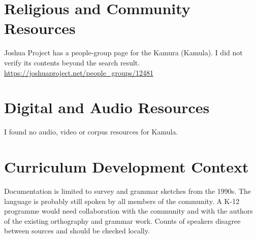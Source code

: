 \documentclass[12pt]{article}
\begin{document}
\section{Religious and Community Resources}
Joshua Project has a people-group page for the Kamura (Kamula). I did not verify its contents beyond the search result. \url{https://joshuaproject.net/people_groups/12481}

\section{Digital and Audio Resources}
I found no audio, video or corpus resources for Kamula.

\section{Curriculum Development Context}
Documentation is limited to survey and grammar sketches from the 1990s. The language is probably still spoken by all members of the community. A K-12 programme would need collaboration with the community and with the authors of the existing orthography and grammar work. Counts of speakers disagree between sources and should be checked locally.
\end{document}
